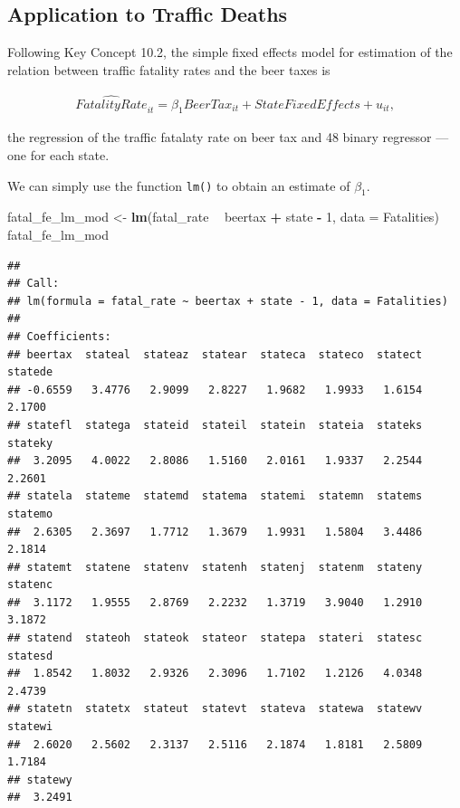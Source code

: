 \documentclass[]{book}
\newenvironment{Shaded}{\begin{snugshade}}{\end{snugshade}}
\newcommand{\KeywordTok}[1]{\textcolor[rgb]{0.13,0.29,0.53}{\textbf{#1}}}
\newcommand{\DataTypeTok}[1]{\textcolor[rgb]{0.13,0.29,0.53}{#1}}
\newcommand{\DecValTok}[1]{\textcolor[rgb]{0.00,0.00,0.81}{#1}}
\newcommand{\StringTok}[1]{\textcolor[rgb]{0.31,0.60,0.02}{#1}}
\newcommand{\OperatorTok}[1]{\textcolor[rgb]{0.81,0.36,0.00}{\textbf{#1}}}
\newcommand{\NormalTok}[1]{#1}
\theoremstyle{definition}
\theoremstyle{definition}
\theoremstyle{definition}
\theoremstyle{remark}
\begin{document}
\subsection*{Application to Traffic
Deaths}\label{application-to-traffic-deaths}

Following Key Concept 10.2, the simple fixed effects model for
estimation of the relation between traffic fatality rates and the beer
taxes is

\begin{align}
\widehat{FatalityRate}_{it} = \beta_1 BeerTax_{it} + StateFixedEffects + u_{it}, \label{eq:fatsemod}
\end{align}

the regression of the traffic fatalaty rate on beer tax and 48 binary
regressor --- one for each state.

We can simply use the function \texttt{lm()} to obtain an estimate of
\(\beta_1\).

\begin{Shaded}
\begin{Highlighting}[]
\NormalTok{fatal_fe_lm_mod <-}\StringTok{ }\KeywordTok{lm}\NormalTok{(fatal_rate }\OperatorTok{~}\StringTok{ }\NormalTok{beertax }\OperatorTok{+}\StringTok{ }\NormalTok{state }\OperatorTok{-}\StringTok{ }\DecValTok{1}\NormalTok{, }\DataTypeTok{data =}\NormalTok{ Fatalities)}
\NormalTok{fatal_fe_lm_mod}
\end{Highlighting}
\end{Shaded}

\begin{verbatim}
## 
## Call:
## lm(formula = fatal_rate ~ beertax + state - 1, data = Fatalities)
## 
## Coefficients:
## beertax  stateal  stateaz  statear  stateca  stateco  statect  statede  
## -0.6559   3.4776   2.9099   2.8227   1.9682   1.9933   1.6154   2.1700  
## statefl  statega  stateid  stateil  statein  stateia  stateks  stateky  
##  3.2095   4.0022   2.8086   1.5160   2.0161   1.9337   2.2544   2.2601  
## statela  stateme  statemd  statema  statemi  statemn  statems  statemo  
##  2.6305   2.3697   1.7712   1.3679   1.9931   1.5804   3.4486   2.1814  
## statemt  statene  statenv  statenh  statenj  statenm  stateny  statenc  
##  3.1172   1.9555   2.8769   2.2232   1.3719   3.9040   1.2910   3.1872  
## statend  stateoh  stateok  stateor  statepa  stateri  statesc  statesd  
##  1.8542   1.8032   2.9326   2.3096   1.7102   1.2126   4.0348   2.4739  
## statetn  statetx  stateut  statevt  stateva  statewa  statewv  statewi  
##  2.6020   2.5602   2.3137   2.5116   2.1874   1.8181   2.5809   1.7184  
## statewy  
##  3.2491
\end{verbatim}
\end{document}
